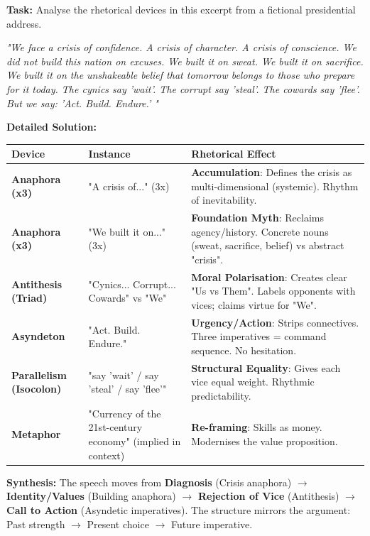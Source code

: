 \documentclass[11pt]{article}
\begin{document}
\begin{exoresolu}
\textbf{Task:} Analyse the rhetorical devices in this excerpt from a fictional presidential address.

\textit{"We face a crisis of confidence. A crisis of character. A crisis of conscience. We did not build this nation on excuses. We built it on sweat. We built it on sacrifice. We built it on the unshakeable belief that tomorrow belongs to those who prepare for it today. The cynics say 'wait'. The corrupt say 'steal'. The cowards say 'flee'. But we say: 'Act. Build. Endure.' "}

\tcblower
\textbf{Detailed Solution:}

\begin{center}
\begin{tabularx}{\linewidth}{|l|l|X|}
\hline
\rowcolor{popblueL} \textbf{Device} & \textbf{Instance} & \textbf{Rhetorical Effect} \\
\hline
\textbf{Anaphora (x3)} & "A crisis of..." (3x) & \textbf{Accumulation}: Defines the crisis as multi-dimensional (systemic). Rhythm of inevitability. \\
\hline
\textbf{Anaphora (x3)} & "We built it on..." (3x) & \textbf{Foundation Myth}: Reclaims agency/history. Concrete nouns (sweat, sacrifice, belief) vs abstract "crisis". \\
\hline
\textbf{Antithesis (Triad)} & "Cynics... Corrupt... Cowards" vs "We" & \textbf{Moral Polarisation}: Creates clear "Us vs Them". Labels opponents with vices; claims virtue for "We". \\
\hline
\textbf{Asyndeton} & "Act. Build. Endure." & \textbf{Urgency/Action}: Strips connectives. Three imperatives = command sequence. No hesitation. \\
\hline
\textbf{Parallelism (Isocolon)} & "say 'wait' / say 'steal' / say 'flee'" & \textbf{Structural Equality}: Gives each vice equal weight. Rhythmic predictability. \\
\hline
\textbf{Metaphor} & "Currency of the 21st-century economy" (implied in context) & \textbf{Re-framing}: Skills as money. Modernises the value proposition. \\
\hline
\end{tabularx}
\end{center}

\textbf{Synthesis:} The speech moves from \textbf{Diagnosis} (Crisis anaphora) $\rightarrow$ \textbf{Identity/Values} (Building anaphora) $\rightarrow$ \textbf{Rejection of Vice} (Antithesis) $\rightarrow$ \textbf{Call to Action} (Asyndetic imperatives). The structure mirrors the argument: Past strength $\rightarrow$ Present choice $\rightarrow$ Future imperative.
\end{exoresolu}
\end{document}
